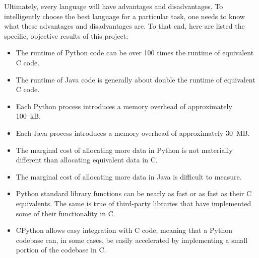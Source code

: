 \documentclass[12pt,letterpaper]{article}
\begin{document}
Ultimately, every language will have advantages and disadvantages. To
intelligently choose the best language for a particular task, one needs to know
what these advantages and disadvantages are. To that end, here are listed the
specific, objective results of this project:

\begin{itemize}
  \item The runtime of Python code can be over 100 times the runtime of
    equivalent C code.
  \item The runtime of Java code is generally about double the runtime of
    equivalent C code.
  \item Each Python process introduces a memory overhead of approximately
    \SI{100}{\kilo B}.
  \item Each Java process introduces a memory overhead of approximately
    \SI{30}{\mega B}.
  \item The marginal cost of allocating more data in Python is not materially
    different than allocating equivalent data in C.
  \item The marginal cost of allocating more data in Java is difficult to
    measure.
  \item Python standard library functions can be nearly as fast or as fast as
    their C equivalents. The same is true of third-party libraries that have
    implemented some of their functionality in C.
  \item CPython allows easy integration with C code, meaning that a Python
    codebase can, in some cases, be easily accelerated by implementing a small
    portion of the codebase in C.
\end{itemize}








\end{document}
